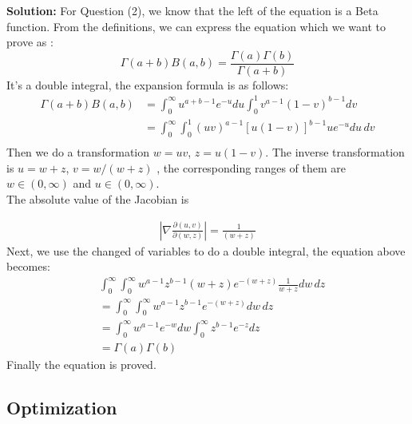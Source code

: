 \documentclass[a4paper]{article}
\begin{document}
\textbf{Solution:} For Question (2), we know that the left of the equation is a Beta function. From the definitions, we can express the equation which we want to prove as : 
\begin{equation}
    \Gamma(a + b) B(a, b)= \frac{\Gamma(a)\Gamma(b)}{\Gamma (a+b)}
\end{equation}
It's a double integral, the expansion formula is as follows:
\begin{equation}
    \begin{aligned}
        \Gamma(a + b) B(a, b)   &= \int_0^\infty u^{a + b -1} e^{-u} du \int_0^1 v^{a-1} (1 - v)^{b-1} dv \\
                                &= \int_0^\infty \int_0^1 (u v)^{a-1}[u (1 - v)]^{b-1} u e^{-u} du \, dv \\
    \end{aligned}
\end{equation}
Then we do a transformation $w = u v$, $z = u (1 - v)$. The inverse transformation is $  u= w + z $, $ v = w \big/(w + z) $ ,  the corresponding ranges of them are $w \in (0, \infty)$ and $u \in (0, \infty)$. \\
The absolute value of the Jacobian is 

\begin{equation}
    \begin{aligned}
        \left|\nabla\frac{\partial(u, v)}{\partial(w, z)}\right| = \frac{1}{(w + z)} 
    \end{aligned}
\end{equation}
Next, we use the changed of variables to do a double integral, the equation above becomes:
\begin{equation}
    \begin{aligned}
        &\int_0^\infty \int_0^\infty w^{a-1} z^{b-1} (w + z) e^{-(w + z)} \frac{1}{w + z} dw \, dz \\
        &= \int_0^\infty \int_0^\infty w^{a-1} z^{b-1} e^{-(w + z)}  dw \, dz \\
        &= \int_0^\infty w^{a-1}e^{-w} dw  \int_0^\infty z^{b-1} e^{- z} dz \\
        &= \Gamma(a)\Gamma(b)
    \end{aligned}
\end{equation}    
Finally the equation is proved.

\subsection{Optimization}
\end{document}

